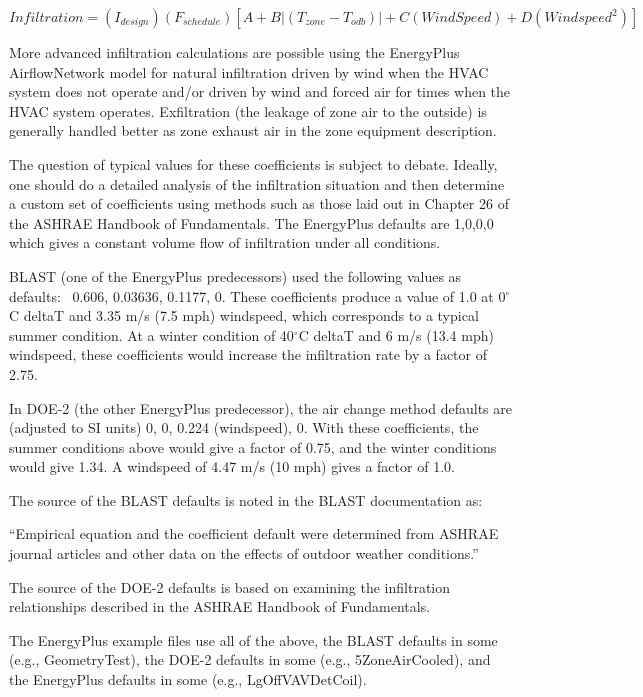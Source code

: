 \begin{equation}
Infiltration = \left( {{I_{design}}} \right)\left( {{F_{schedule}}} \right)\left[ {A + B\left| {\left( {{T_{zone}} - {T_{odb}}} \right)} \right| + C\left( {WindSpeed} \right) + D\left( {Windspee{d^2}} \right)} \right]
\end{equation}

More advanced infiltration calculations are possible using the EnergyPlus AirflowNetwork model for natural infiltration driven by wind when the HVAC system does not operate and/or driven by wind and forced air for times when the HVAC system operates. Exfiltration (the leakage of zone air to the outside) is generally handled better as zone exhaust air in the zone equipment description.

The question of typical values for these coefficients is subject to debate. Ideally, one should do a detailed analysis of the infiltration situation and then determine a custom set of coefficients using methods such as those laid out in Chapter 26 of the ASHRAE Handbook of Fundamentals. The EnergyPlus defaults are 1,0,0,0 which gives a constant volume flow of infiltration under all conditions.

BLAST (one of the EnergyPlus predecessors) used the following values as defaults:~ 0.606, 0.03636, 0.1177, 0. These coefficients produce a value of 1.0 at 0$^{\circ}$C deltaT and 3.35 m/s (7.5 mph) windspeed, which corresponds to a typical summer condition. At a winter condition of 40$^{\circ}$C deltaT and 6 m/s (13.4 mph) windspeed, these coefficients would increase the infiltration rate by a factor of 2.75.

In DOE-2 (the other EnergyPlus predecessor), the air change method defaults are (adjusted to SI units) 0, 0, 0.224 (windspeed), 0. With these coefficients, the summer conditions above would give a factor of 0.75, and the winter conditions would give 1.34. A windspeed of 4.47 m/s (10 mph) gives a factor of 1.0.

The source of the BLAST defaults is noted in the BLAST documentation as:

``Empirical equation and the coefficient default were determined from ASHRAE journal articles and other data on the effects of outdoor weather conditions.''

The source of the DOE-2 defaults is based on examining the infiltration relationships described in the ASHRAE Handbook of Fundamentals.

The EnergyPlus example files use all of the above, the BLAST defaults in some (e.g., GeometryTest), the DOE-2 defaults in some (e.g., 5ZoneAirCooled), and the EnergyPlus defaults in some (e.g., LgOffVAVDetCoil).

